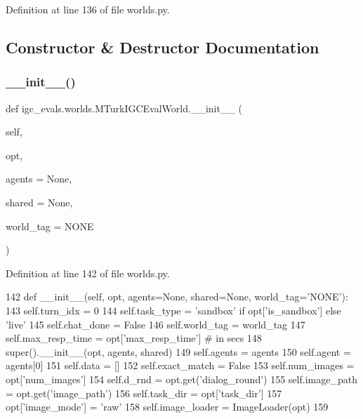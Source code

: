 Definition at line 136 of file worlds.\+py.



\subsection{Constructor \& Destructor Documentation}
\mbox{\label{classigc__evals_1_1worlds_1_1MTurkIGCEvalWorld_a917456c1cd24f8472e602699eb52413b}} 
\subsubsection{\texorpdfstring{\+\_\+\+\_\+init\+\_\+\+\_\+()}{\_\_init\_\_()}}
{\footnotesize\ttfamily def igc\+\_\+evals.\+worlds.\+M\+Turk\+I\+G\+C\+Eval\+World.\+\_\+\+\_\+init\+\_\+\+\_\+ (\begin{DoxyParamCaption}\item[{}]{self,  }\item[{}]{opt,  }\item[{}]{agents = {\ttfamily None},  }\item[{}]{shared = {\ttfamily None},  }\item[{}]{world\+\_\+tag = {\ttfamily \textquotesingle{}NONE\textquotesingle{}} }\end{DoxyParamCaption})}



Definition at line 142 of file worlds.\+py.


\begin{DoxyCode}
142     \textcolor{keyword}{def }\_\_init\_\_(self, opt, agents=None, shared=None, world\_tag='NONE'):
143         self.turn\_idx = 0
144         self.task\_type = \textcolor{stringliteral}{'sandbox'} \textcolor{keywordflow}{if} opt[\textcolor{stringliteral}{'is\_sandbox'}] \textcolor{keywordflow}{else} \textcolor{stringliteral}{'live'}
145         self.chat\_done = \textcolor{keyword}{False}
146         self.world\_tag = world\_tag
147         self.max\_resp\_time = opt[\textcolor{stringliteral}{'max\_resp\_time'}]  \textcolor{comment}{# in secs}
148         super().\_\_init\_\_(opt, agents, shared)
149         self.agents = agents
150         self.agent = agents[0]
151         self.data = []
152         self.exact\_match = \textcolor{keyword}{False}
153         self.num\_images = opt[\textcolor{stringliteral}{'num\_images'}]
154         self.d\_rnd = opt.get(\textcolor{stringliteral}{'dialog\_round'})
155         self.image\_path = opt.get(\textcolor{stringliteral}{'image\_path'})
156         self.task\_dir = opt[\textcolor{stringliteral}{'task\_dir'}]
157         opt[\textcolor{stringliteral}{'image\_mode'}] = \textcolor{stringliteral}{'raw'}
158         self.image\_loader = ImageLoader(opt)
159 
\end{DoxyCode}


